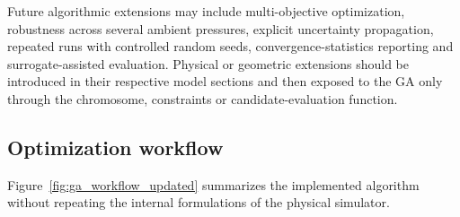 Future algorithmic extensions may include multi-objective optimization, robustness
across several ambient pressures, explicit uncertainty propagation, repeated runs
with controlled random seeds, convergence-statistics reporting and surrogate-assisted
evaluation. Physical or geometric extensions should be introduced in their respective
model sections and then exposed to the GA only through the chromosome, constraints or
candidate-evaluation function.

\subsection{Optimization workflow}

Figure~\ref{fig:ga_workflow_updated} summarizes the implemented algorithm without
repeating the internal formulations of the physical simulator.

